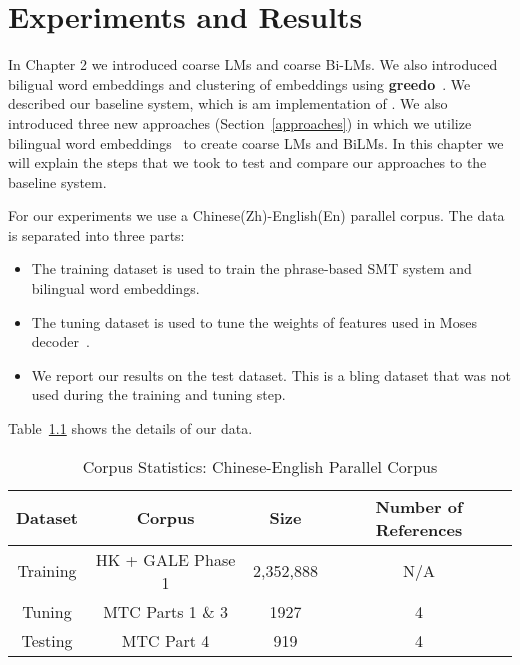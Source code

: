 
%
%

\chapter{Experiments and Results}
\label{three}
In Chapter 2 we introduced coarse LMs and coarse Bi-LMs. We also introduced biligual word embeddings and clustering of embeddings using \textbf{greedo}~\cite{Stratos2014}. We described our baseline system, which is am implementation of \cite{Stewart2014}. We also introduced three new approaches (Section~\ref{approaches}) in which we utilize bilingual word embeddings~\cite{Hermann14} to create coarse LMs and BiLMs. In this chapter we will explain the steps that we took to test and compare our approaches to the baseline system.

For our experiments we use a Chinese(Zh)-English(En) parallel corpus. The data is separated into three parts:
\begin{itemize}
	\item The training dataset is used to train the phrase-based SMT system and bilingual word embeddings.
	\item The tuning dataset is used to tune the weights of features used in Moses decoder~\cite{Koehn2007Moses}.
	\item We report our results on the test dataset. This is a bling dataset that was not used during the training and tuning step.
\end{itemize}
Table~\ref{table:corpus-statistics} shows the details of our data.

\begin{table}
	\begin{center}
		\begin{tabular}{|c|c|c|c|}
			\hline
			\textbf{Dataset} & \textbf{Corpus} & \textbf{Size} & \textbf{Number of References}\\\hline
			Training & HK + GALE Phase 1 & 2,352,888 & N/A \\\hline
			Tuning & MTC Parts 1 \& 3 & 1927 & 4\\\hline
			Testing & MTC Part 4 & 919 & 4\\\hline
		\end{tabular}
		\caption{Corpus Statistics: Chinese-English Parallel Corpus}
		\label{table:corpus-statistics}		
	\end{center}
\end{table}

